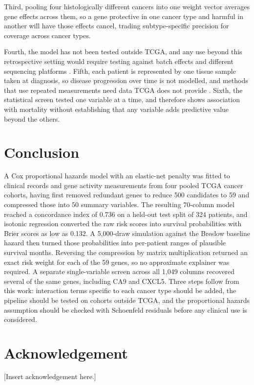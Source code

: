 \documentclass[10pt,a4paper]{article}
\begin{document}
Third, pooling four histologically different cancers into one weight vector
averages gene effects across them, so a gene protective in one cancer type and
harmful in another will have those effects cancel, trading subtype-specific
precision for coverage across cancer types.

Fourth, the model has not been tested outside TCGA, and any use beyond this
retrospective setting would require testing against batch effects and different
sequencing platforms \citep{poirion2021deepprog}. Fifth, each patient is
represented by one tissue sample taken at diagnosis, so disease progression over
time is not modelled, and methods that use repeated measurements need data TCGA
does not provide \citep{lee2020dynamic}. Sixth, the statistical screen tested one
variable at a time, and therefore shows association with mortality without
establishing that any variable adds predictive value beyond the others.

\section{Conclusion}

A Cox proportional hazards model with an elastic-net penalty was fitted to clinical
records and gene activity measurements from four pooled TCGA cancer cohorts, having
first removed redundant genes to reduce 500 candidates to 59 and compressed those
into 50 summary variables. The resulting 70-column model reached a concordance
index of 0.736 on a held-out test split of 324 patients, and isotonic regression
converted the raw risk scores into survival probabilities with Brier scores as low
as 0.132. A 5,000-draw simulation against the Breslow baseline hazard then turned
those probabilities into per-patient ranges of plausible survival months. Reversing
the compression by matrix multiplication returned an exact risk weight for each of
the 59 genes, so no approximate explainer was required. A separate
single-variable screen across all 1,049 columns recovered several of the same
genes, including CA9 and CXCL5. Three steps follow from this work: interaction
terms specific to each cancer type should be added, the pipeline should be tested on
cohorts outside TCGA, and the proportional hazards assumption should be checked
with Schoenfeld residuals before any clinical use is considered.

\section*{Acknowledgement}

[Insert acknowledgement here.]

\vspace{1em}


\end{document}
